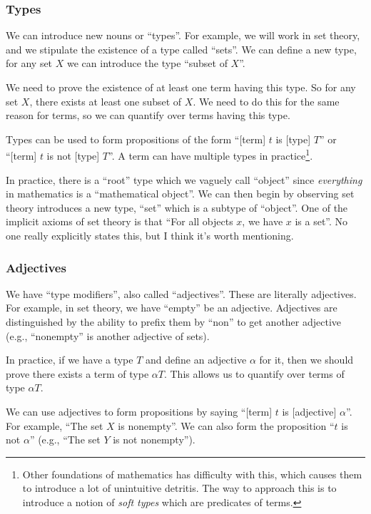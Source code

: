 \subsubsection{Types}
We can introduce new nouns or ``types''. For example, we will work in
set theory, and we stipulate the existence of a type called ``sets''. We
can define a new type, for any set $X$ we can introduce the type
``subset of $X$''.

We need to prove the existence of at least one term having this type. So
for any set $X$, there exists at least one subset of $X$. We need to do
this for the same reason for terms, so we can quantify over terms having
this type.

Types can be used to form propositions of the form ``[term] $t$ is
[type] $T$'' or ``[term] $t$ is not [type] $T$''. A term can have
multiple types in practice\footnote{Other foundations of mathematics has
difficulty with this, which causes them to introduce a lot of
unintuitive detritis. The way to approach this is to introduce a notion
of \emph{soft types} which are predicates of terms.}.

\begin{remark}
In practice, there is a ``root'' type which we vaguely call ``object''
since \emph{everything} in mathematics is a ``mathematical object''.
We can then begin by observing set theory introduces a new type, ``set''
which is a subtype of ``object''. One of the implicit axioms of set
theory is that ``For all objects $x$, we have $x$ is a set''. No one
really explicitly states this, but I think it's worth mentioning.
\end{remark}

\subsubsection{Adjectives}
We have ``type modifiers'', also called ``adjectives''. These are
literally adjectives. For example, in set theory, we have ``empty'' be
an adjective. Adjectives are distinguished by the ability to prefix them
by ``non'' to get another adjective (e.g., ``nonempty'' is another
adjective of sets).

In practice, if we have a type $T$ and define an adjective $\alpha$ for
it, then we should prove there exists a term of type $\alpha T$. This
allows us to quantify over terms of type $\alpha T$.

We can use adjectives to form propositions by saying ``[term] $t$ is
[adjective] $\alpha$''. For example, ``The set $X$ is nonempty''. We can
also form the proposition ``$t$ is not $\alpha$'' (e.g., ``The set $Y$
is not nonempty'').

